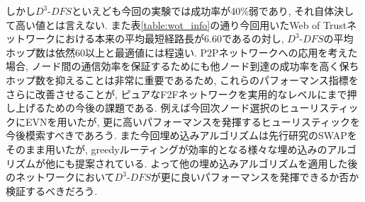 \documentclass[technicalreport]{./ieicej-v3.0/UTF/ieicej}
\begin{document}
しかし$D^3$-$DFS$といえども今回の実験では成功率が40\%弱であり, それ自体決して高い値とは言えない. また表\ref{table:wot_info}の通り今回用いたWeb of Trustネットワークにおける本来の平均最短経路長が6.60であるの対し, $D^3$-$DFS$の平均ホップ数は依然60以上と最適値には程遠い. P2Pネットワークへの応用を考えた場合, ノード間の通信効率を保証するためにも他ノード到達の成功率を高く保ちホップ数を抑えることは非常に重要であるため, これらのパフォーマンス指標をさらに改善させることが, ピュアなF2Fネットワークを実用的なレベルにまで押し上げるための今後の課題である. 例えば今回次ノード選択のヒューリスティックにEVNを用いたが, 更に高いパフォーマンスを発揮するヒューリスティックを今後模索すべきであろう. また今回埋め込みアルゴリズムは先行研究のSWAPをそのまま用いたが, greedyルーティングが効率的となる様々な埋め込みのアルゴリズムが他にも提案されている. よって他の埋め込みアルゴリズムを適用した後のネットワークにおいて$D^3$-$DFS$が更に良いパフォーマンスを発揮できるか否か検証するべきだろう.


\end{document}
